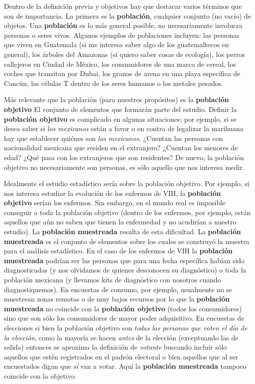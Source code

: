 \documentclass[
]{book}
\begin{document}
Dentro de la definición previa y objetivos hay que destacar varios términos que son de importancia. La primera es la \textbf{población}, cualquier conjunto (no vacío) de objetos. Una \textbf{población} es lo más general posible, no necesariamente involucra personas o seres vivos. Algunos ejemplos de poblaciones incluyen: las personas que viven en Guatemala (si me interesa saber algo de los guatemaltecos en general), los árboles del Amazonas (si quiero saber cosas de ecología), los perros callejeros en Ciudad de México, los consumidores de una marca de cereal, los coches que transitan por Dubai, los granos de arena en una playa específica de Cancún, las células T dentro de los seres humanos o los metales pesados.

Más relevante que la población (para nuestros propósitos) es la \textbf{población objetivo} El conjunto de elementos que formarán parte del estudio. Definir la \textbf{población objetivo} es complicado en algunas situaciones; por ejemplo, si se desea saber si \emph{los mexicanos} están a favor o en contra de legalizar la marihuana hay que establecer quiénes son \emph{los mexicanos}. ¿Cuentan las personas con nacionalidad mexicana que residen en el extranjero? ¿Cuentan los menores de edad? ¿Qué pasa con los extranjeros que son residentes? De nuevo, la población objetivo no necesariamente son personas, es sólo aquello que nos interesa medir.

Idealmente el estudio estadístico sería sobre la población objetivo. Por ejemplo, si nos interesa estudiar la evolución de los enfermos de VIH, la \textbf{población objetivo} serían los enfermos. Sin embargo, en el mundo real es imposible conseguir a toda la población objetivo (dentro de los enfermos, por ejemplo, están aquellos que aún no saben que tienen la enfermedad y no acudirían a nuestro estudio). La \textbf{población muestreada} resulta de esta dificultad. La \textbf{población muestreada} es el conjunto de elementos sobre los cuales se construyó la muestra para el análisis estadístico. En el caso de los enfermos de VIH la \textbf{población muestreada} podrían ser las personas que para una fecha específica habían sido diagnosticadas (y nos olvidamos de quienes desconocen su diagnóstico) o toda la población mexicana (y llevamos kits de diagnóstico con nosotros cuando diagnostiquemos). En encuestas de consumo, por ejemplo, usualmente no se muestrean zonas remotas o de muy bajos recursos por lo que la \textbf{población muestreada} no coincide con la \textbf{población objetivo} (todos los consumidores) sino que son sólo los consumidores de mayor poder adquisitivo. En encuestas de elecciones si bien la población objetivo son \emph{todas las personas que voten el día de la elección}, como la mayoría se hacen \emph{antes} de la elección (exceptuando las de salida) entonces se aproxima la definición de \emph{votante} buscando incluir sólo aquellos que estén registrados en el padrón electoral o bien aquellos que al ser encuestados digan que \emph{sí} van a votar. Aquí la \textbf{población muestreada} tampoco coincide con la objetivo.
\end{document}
